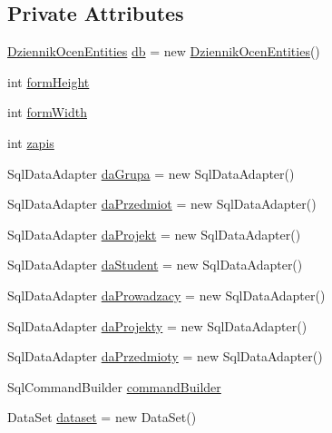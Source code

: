 \subsection*{Private Attributes}
\begin{DoxyCompactItemize}
\item 
\hyperlink{class_dziennik_ocen_1_1_dziennik_ocen_entities}{Dziennik\+Ocen\+Entities} \hyperlink{class_dziennik_ocen_1_1_form_admin_a77a65310263c63d03f167e6099dc4bc8}{db} = new \hyperlink{class_dziennik_ocen_1_1_dziennik_ocen_entities}{Dziennik\+Ocen\+Entities}()
\item 
int \hyperlink{class_dziennik_ocen_1_1_form_admin_a2802bf47fadb6ecc1ccf40a94e065d05}{form\+Height}
\item 
int \hyperlink{class_dziennik_ocen_1_1_form_admin_a2abc13ba3dc7102aa96ce608fcb1fd9c}{form\+Width}
\item 
int \hyperlink{class_dziennik_ocen_1_1_form_admin_a3ddc4920ca4ca7352739035f2afd5341}{zapis}
\item 
Sql\+Data\+Adapter \hyperlink{class_dziennik_ocen_1_1_form_admin_af4bcf765df04fbfac6cc99f1e911210b}{da\+Grupa} = new Sql\+Data\+Adapter()
\item 
Sql\+Data\+Adapter \hyperlink{class_dziennik_ocen_1_1_form_admin_a32d386bedadefccecfb5a7667f5aefb7}{da\+Przedmiot} = new Sql\+Data\+Adapter()
\item 
Sql\+Data\+Adapter \hyperlink{class_dziennik_ocen_1_1_form_admin_aa855b7aa18748501f995cd4bd664e8a5}{da\+Projekt} = new Sql\+Data\+Adapter()
\item 
Sql\+Data\+Adapter \hyperlink{class_dziennik_ocen_1_1_form_admin_a72ffbfd2d1b16625886143ba255e08e9}{da\+Student} = new Sql\+Data\+Adapter()
\item 
Sql\+Data\+Adapter \hyperlink{class_dziennik_ocen_1_1_form_admin_a182d378addcef222536f9c514f85a703}{da\+Prowadzacy} = new Sql\+Data\+Adapter()
\item 
Sql\+Data\+Adapter \hyperlink{class_dziennik_ocen_1_1_form_admin_ab7869a1097cd333154336f7f3008295c}{da\+Projekty} = new Sql\+Data\+Adapter()
\item 
Sql\+Data\+Adapter \hyperlink{class_dziennik_ocen_1_1_form_admin_a906f1b10c5e6a0a937e7cd281952cf9e}{da\+Przedmioty} = new Sql\+Data\+Adapter()
\item 
Sql\+Command\+Builder \hyperlink{class_dziennik_ocen_1_1_form_admin_ad78cf92a31e4ac705fc1b07f91eccf12}{command\+Builder}
\item 
Data\+Set \hyperlink{class_dziennik_ocen_1_1_form_admin_aead339c7648bc14d61f61eb9192157e2}{dataset} = new Data\+Set()

\end{DoxyCompactItemize}
